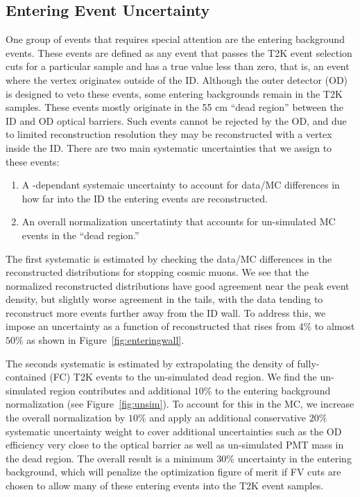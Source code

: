 \subsection{Entering Event Uncertainty}
\label{subsec:entering}

One group of events that requires special attention are the entering background
events.  These events are defined as any event that passes
the T2K event selection cuts for a particular sample and has a true \wall
value less than zero, that is, an event where the vertex originates outside of
the ID\@.  Although the outer detector (OD) is designed to veto these events,
some entering backgrounds remain in the T2K samples.  These events mostly
originate in the 55 cm ``dead region'' between the ID and OD optical barriers.
Such events cannot be rejected by the OD, and due to limited reconstruction
resolution they may be reconstructed with a vertex inside the ID\@.  
There are two main systematic uncertainties that we assign to these events:

\begin{enumerate}
  \item A \wall-dependant systemaic uncertainty to account for data/MC differences in 
    how far into the ID the entering events are reconstructed.
  \item An overall normalization uncertatinty that accounts for un-simulated MC events
    in the ``dead region.''
\end{enumerate}

The first systematic is estimated by checking the data/MC differences in the
reconstructed \wall distributions for stopping cosmic muons. We see that the
normalized reconstructed \wall distributions have good agreement near the peak
event density, but slightly worse agreement in the tails, with the data tending
to reconstruct more events further away from the ID wall.  To address this, we
impose an uncertainty as a function of reconstructed \wall that rises from
$4\%$ to almost $50\%$ as shown in Figure~\ref{fig:enteringwall}.

The seconds systematic is estimated by extrapolating the density of
fully-contained (FC) T2K events to the un-simulated dead region.  We find the
un-simulated region contributes and additional $10\%$ to the entering
background normalization (see Figure~\ref{fig:unsim}).  To account for
this in the MC, we increase the overall normalization by $10\%$ and apply an
additional conservative $20\%$ systematic uncertainty weight to cover
additional uncertainties such as the OD efficiency very close to the optical barrier
as well as un-simulated PMT mass in the dead region.  The overall result is a
minimum $30\%$ uncertainty in the entering background, which will penalize the
optimization figure of merit if FV cuts are chosen to allow many of these
entering events into the T2K event samples.

